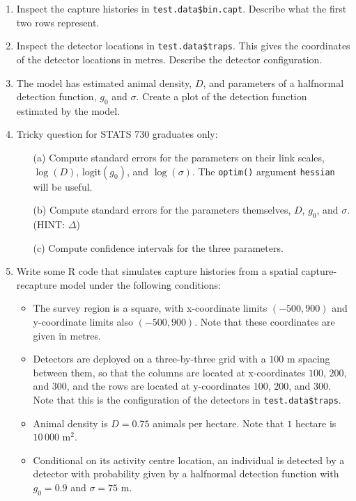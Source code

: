 \documentclass{article}
\begin{document}
\begin{enumerate}

\item Inspect the capture histories in
  \texttt{test.data\$bin.capt}. Describe what the first two rows
  represent.

\item Inspect the detector locations in \texttt{test.data\$traps}. This
  gives the coordinates of the detector locations in metres. Describe
  the detector configuration.

\item The model has estimated animal density, $D$, and parameters of a
  halfnormal detection function, $g_0$ and $\sigma$. Create a plot of
  the detection function estimated by the model.

\item Tricky question for STATS 730 graduates only:
  \begin{enumerate}
  \item[(a)] Compute standard errors for the parameters on their link
    scales, $\log(D)$, $\text{logit}(g_0)$, and $\log(\sigma)$. The
    \texttt{optim()} argument \texttt{hessian} will be useful.
  \item[(b)] Compute standard errors for the parameters themselves, $D$,
    $g_0$, and $\sigma$. (HINT: $\Delta$)
  \item[(c)] Compute confidence intervals for the three parameters.
  \end{enumerate}
  
\item Write some R code that simulates capture histories from a
  spatial capture-recapture model under the following conditions:
  \begin{itemize}
  \item The survey region is a square, with x-coordinate limits
    $(-500, 900)$ and y-coordinate limits also $(-500, 900)$. Note
    that these coordinates are given in metres.
  \item Detectors are deployed on a three-by-three grid with a $100$ m
    spacing between them, so that the columns are located at
    x-coordinates $100$, $200$, and $300$, and the rows are located at
    y-coordinates $100$, $200$, and $300$. Note that this is the
    configuration of the detectors in \texttt{test.data\$traps}.
  \item Animal density is $D = 0.75$ animals per hectare. Note that
    $1$ hectare is $10\,000$ m$^2$.
  \item Conditional on its activity centre location, an individual is
    detected by a detector with probability given by a halfnormal
    detection function with $g_0 = 0.9$ and $\sigma = 75$ m.
  \end{itemize}


\end{enumerate}
\end{document}
